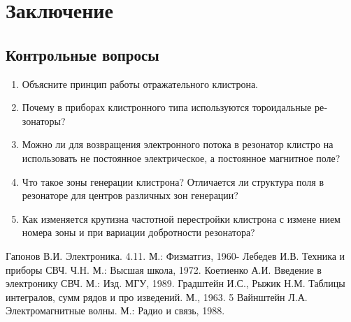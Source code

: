 
\section{Заключение}

\subsection{Контрольные вопросы}

\begin{enumerate}
	\item Объясните принцип работы отражательного клистрона.
	\item Почему в приборах клистронного типа используются тороидальные ре­
	зонаторы?
	\item Можно ли для возвращения электронного потока в резонатор клистро­
	на использовать не постоянное электрическое, а постоянное магнитное поле?
	\item Что такое зоны генерации клистрона? Отличается ли структура поля
	в резонаторе для центров различных зон генерации?
	\item Как изменяется крутизна частотной перестройки клистрона с измене­
	нием номера зоны и при вариации добротности резонатора?
\end{enumerate}

\begin{thebibliography}{}
	  Гапонов В.И. Электроника. 4.11. М.: Физматгиз, 1960-
	  Лебедев И.В. Техника и приборы СВЧ. Ч.Н. М.: Высшая школа, 1972.
	  Коетиенко А.И. Введение в электронику СВЧ. М.: Изд. МГУ, 1989.
	  Градштейн И.С., Рыжик Н.М. Таблицы интегралов, сумм рядов и про­
	изведений. М., 1963. 5
	  Вайнштейн Л.А. Электромагнитные волны. М.: Радио и связь, 1988.
\end{thebibliography}
